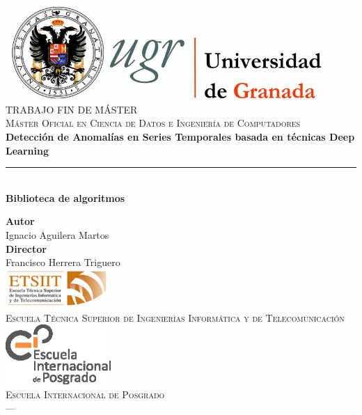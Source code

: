\begin{titlepage}
 
 
\newlength{\centeroffset}
\setlength{\centeroffset}{-0.5\oddsidemargin}
\addtolength{\centeroffset}{0.5\evensidemargin}
\thispagestyle{empty}

\noindent\hspace*{\centeroffset}\begin{minipage}{\textwidth}

\centering
\includegraphics[width=0.9\textwidth]{imagenes/logos/logo_ugr.jpg}\\[1.4cm]

\textsc{ \Large TRABAJO FIN DE MÁSTER\\[0.2cm]}
\textsc{ Máster Oficial en Ciencia de Datos e Ingeniería de Computadores}\\[1cm]
% 
{\Huge\bfseries Detección de Anomalías en Series Temporales basada en técnicas Deep Learning\\
}
\noindent\rule[-1ex]{\textwidth}{3pt}\\[3.5ex]
{\large\bfseries Biblioteca de algoritmos}
\end{minipage}

\vspace{2.5cm}
\noindent\hspace*{\centeroffset}\begin{minipage}{\textwidth}
\centering

\textbf{Autor}\\ {Ignacio Aguilera Martos}\\[2.5ex]
\textbf{Director}\\
{Francisco Herrera Triguero}\\[2cm]
\includegraphics[width=0.3\textwidth]{imagenes/logos/etsiit_logo.png}\\[0.1cm]
\textsc{Escuela Técnica Superior de Ingenierías Informática y de Telecomunicación}\\
\includegraphics[width=0.3\textwidth]{imagenes/logos/escuela-internacional-de-posgrado-ugr.eps}\\[0.1cm]
\textsc{Escuela Internacional de Posgrado}\\
\textsc{---}\\


\end{minipage}
\end{titlepage}
